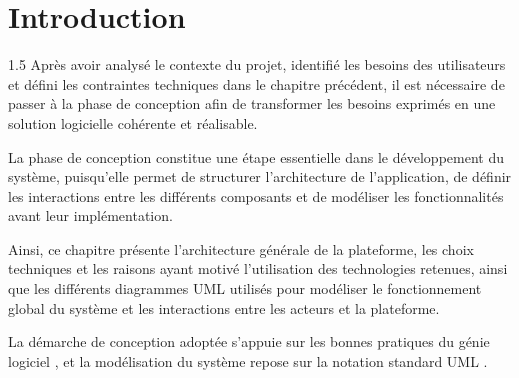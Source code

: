 \documentclass[a4paper,12pt]{report}
\begin{document}
\newpage
\section{Introduction}
\vspace{0.5cm}
\begin{spacing}{1.5}
\justifying
Après avoir analysé le contexte du projet, identifié les besoins des utilisateurs et défini les contraintes techniques dans le chapitre précédent, il est nécessaire de passer à la phase de conception afin de transformer les besoins exprimés en une solution logicielle cohérente et réalisable.

La phase de conception constitue une étape essentielle dans le développement du système, puisqu'elle permet de structurer l'architecture de l'application, de définir les interactions entre les différents composants et de modéliser les fonctionnalités avant leur implémentation.

Ainsi, ce chapitre présente l'architecture générale de la plateforme, les choix techniques et les raisons ayant motivé l'utilisation des technologies retenues, ainsi que les différents diagrammes UML utilisés pour modéliser le fonctionnement global du système et les interactions entre les acteurs et la plateforme.

La démarche de conception adoptée s'appuie sur les bonnes pratiques du génie logiciel
\cite{sommerville2016}, et la modélisation du système repose sur la notation standard UML
\cite{booch2005}.

\end{spacing}
\end{document}
